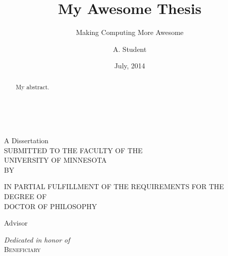\documentclass[12pt,letterpaper,oneside,oldfontcommands]{memoir}
\title{My Awesome Thesis}
\subtitle{Making Computing More Awesome}
\author{A. Student}
\date{July, 2014}
\begin{document}
\pagestyle{empty}

\begin{center}
\thetitle \\
\textit{\thesubtitle}

\vskip 1in
A Dissertation \\
SUBMITTED TO THE FACULTY OF THE \\
UNIVERSITY OF MINNESOTA \\
BY
\vskip 0.75in
\theauthor

\vskip 0.75in
IN PARTIAL FULFILLMENT OF THE REQUIREMENTS FOR THE DEGREE OF \\
DOCTOR OF PHILOSOPHY

\vskip 0.75in
Advisor

\vskip 0.75in
\thedate

\end{center}

\newpage
\vspace*{1.5in}

\vspace*{1in}

\newpage
\frontmatter %
\pagestyle{plain}

\vspace*{1.5in}
\begin{center}
    \textit{Dedicated in honor of} \\
    \textsc{Beneficiary}
\end{center}

\newpage

\newpage
\begin{abstract}
    My abstract.
\end{abstract}

\newpage
\pagestyle{ruled}
\tableofcontents*
\newpage
\listoftables
\newpage
\listoffigures
\newpage
\listoflistings

\mainmatter

\SingleSpacing

\appendix

\end{document}
